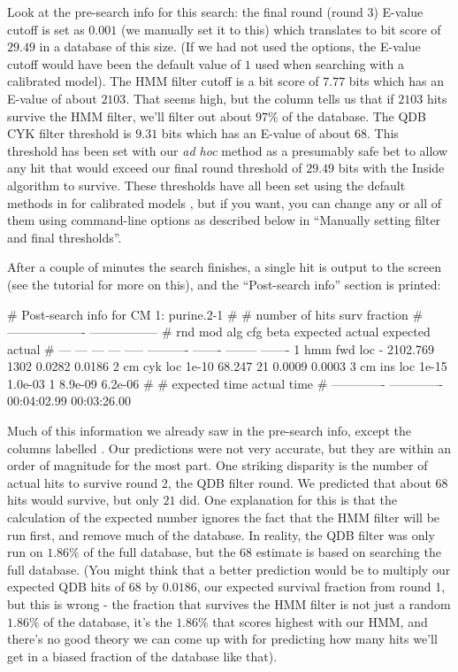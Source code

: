 Look at the pre-search info for this search: the final round (round 3)
E-value cutoff is set as $0.001$ (we manually set it to this) which
translates to bit score of $29.49$ in a database of this size. (If we
had not used the  options, the E-value cutoff would have been
the default value of $1$ used when searching with a calibrated
model). The HMM filter cutoff is a bit score of $7.77$ bits which has
an E-value of about $2103$.  That seems high, but the 
column tells us that if $2103$ hits survive the HMM filter, we'll
filter out about $97\%$ of the database. The QDB CYK filter threshold
is $9.31$ bits which has an E-value of about $68$. This threshold has
been set with our \emph{ad hoc} method as a presumably safe bet to
allow any hit that would exceed our final round threshold of $29.49$
bits with the Inside algorithm to survive. These thresholds have all
been set using the default methods in  for calibrated
models \cite{Nawrocki09b}, but if you want, you can change any or all
of them using command-line options as described below in ``Manually
setting filter and final thresholds''.

After a couple of minutes the search finishes, a single hit is output
to the screen (see the tutorial for more on this), and the
``Post-search info'' section is printed:

\begin{sreoutput}
# Post-search info for CM 1: purine.2-1
#
#                              number of hits       surv fraction  
#                            -------------------  -----------------
# rnd  mod  alg  cfg   beta    expected   actual  expected   actual
# ---  ---  ---  ---  -----  ----------  -------  --------  -------
    1  hmm  fwd  loc      -    2102.769     1302    0.0282   0.0186
    2   cm  cyk  loc  1e-10      68.247       21    0.0009   0.0003
    3   cm  ins  loc  1e-15     1.0e-03        1   8.9e-09  6.2e-06
#
# expected time    actual time
# -------------  -------------
    00:04:02.99    00:03:26.00
\end{sreoutput}

Much of this information we already saw in the pre-search info, except
the columns labelled . Our predictions were not very
accurate, but they are within an order of magnitude for the most
part. One striking disparity is the number of actual hits to survive
round 2, the QDB filter round. We predicted that about $68$ hits
would survive, but only $21$ did. One explanation for this is
that the calculation of the expected number ignores the fact that the
HMM filter will be run first, and remove much of the database. In
reality, the QDB filter was only run on $1.86\%$ of the full
database, but the $68$ estimate is based on searching the full
database. (You might think that a better prediction would be to 
multiply our expected QDB hits of $68$ by $0.0186$, our expected
survival fraction from round 1, but this is wrong - the fraction that
survives the HMM filter is not just a random $1.86\%$ of the database,
it's the $1.86\%$ that scores highest with our HMM, and there's no good
theory we can come up with for predicting how many hits we'll get in a
biased fraction of the database like that).

